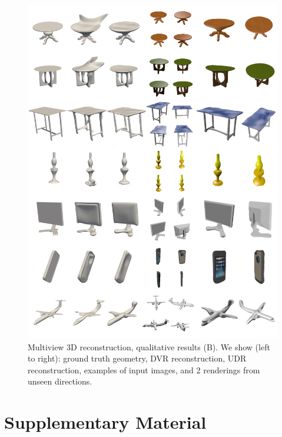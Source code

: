 \documentclass[runningheads]{llncs}
\begin{document}
\begin{figure}[t]
    \centering
    \includegraphics[width=\textwidth]{lior2.jpg}
    \caption{Multiview 3D reconstruction, qualitative results (B). We show (left to right): ground truth geometry, DVR reconstruction, UDR reconstruction, examples of input images, and 2 renderings from unseen directions. }
    \label{fig:recon2}
\end{figure}



\clearpage

 
%
%






\clearpage

\section{Supplementary Material}
\end{document}
